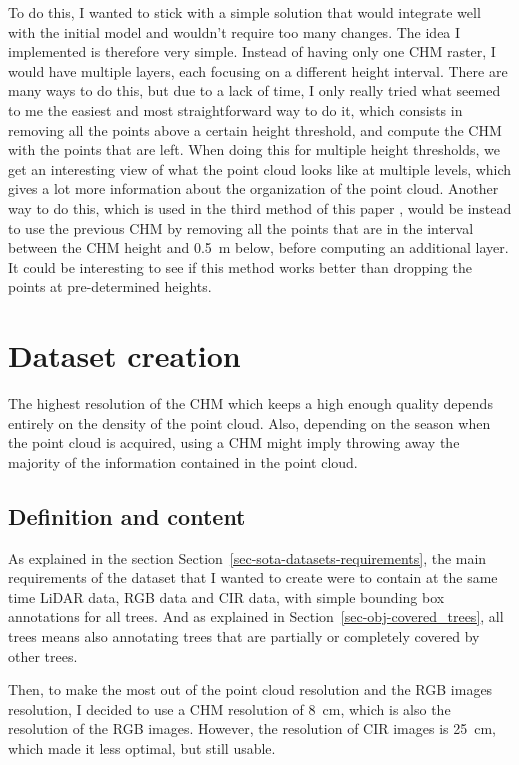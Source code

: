 \documentclass[
  letterpaper,
  DIV=11,
  numbers=noendperiod]{scrartcl}
\begin{document}
To do this, I wanted to stick with a simple solution that would
integrate well with the initial model and wouldn't require too many
changes. The idea I implemented is therefore very simple. Instead of
having only one CHM raster, I would have multiple layers, each focusing
on a different height interval. There are many ways to do this, but due
to a lack of time, I only really tried what seemed to me the easiest and
most straightforward way to do it, which consists in removing all the
points above a certain height threshold, and compute the CHM with the
points that are left. When doing this for multiple height thresholds, we
get an interesting view of what the point cloud looks like at multiple
levels, which gives a lot more information about the organization of the
point cloud. Another way to do this, which is used in the third method
of this paper \autocite{lidar_benchmark}, would be instead to use the
previous CHM by removing all the points that are in the interval between
the CHM height and 0.5~m below, before computing an additional layer. It
could be interesting to see if this method works better than dropping
the points at pre-determined heights.

\section{Dataset creation}\label{sec-dataset}

The highest resolution of the CHM which keeps a high enough quality
depends entirely on the density of the point cloud. Also, depending on
the season when the point cloud is acquired, using a CHM might imply
throwing away the majority of the information contained in the point
cloud.

\subsection{Definition and content}\label{definition-and-content}

As explained in the section
Section~\ref{sec-sota-datasets-requirements}, the main requirements of
the dataset that I wanted to create were to contain at the same time
LiDAR data, RGB data and CIR data, with simple bounding box annotations
for all trees. And as explained in Section~\ref{sec-obj-covered_trees},
all trees means also annotating trees that are partially or completely
covered by other trees.

Then, to make the most out of the point cloud resolution and the RGB
images resolution, I decided to use a CHM resolution of 8~cm, which is
also the resolution of the RGB images. However, the resolution of CIR
images is 25~cm, which made it less optimal, but still usable.
\end{document}

